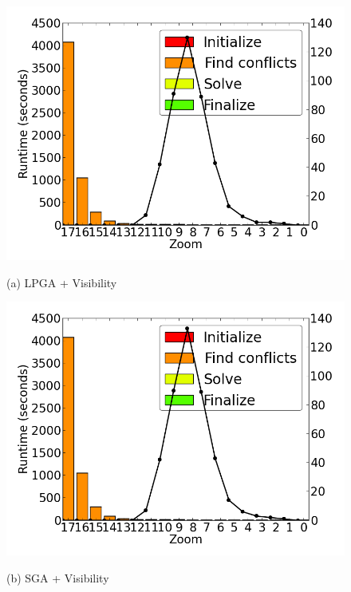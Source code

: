\begin{figure}[tb]
  \begin{minipage}{0.329\linewidth}
    \centerline{\includegraphics[width=1.0\linewidth]{./figs/prelim_lin_30k_uswaterway_heuristic_A.png}}
    \centerline{(a) LPGA + Visibility}
  \end{minipage} \hfill
  \begin{minipage}{0.329\linewidth}
    \centerline{\includegraphics[width=1.0\linewidth]{./figs/prelim_lin_30k_uswaterway_lp_A.png}}
    \centerline{(b) SGA + Visibility}
  \end{minipage} \hfill
  \begin{minipage}{0.329\linewidth}

\end{minipage}
\end{figure}
